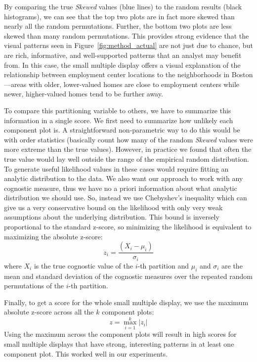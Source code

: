 By comparing the true \emph{Skewed} values (blue lines) to the random results (black histograms), we can see that the top two plots are in fact more skewed than nearly all the random permutations. Further, the bottom two plots are less skewed than many random permutations. This provides strong evidence that the visual patterns seen in Figure~\ref{fig:method_actual} are not just due to chance, but are rich, informative, and well-supported patterns that an analyst may benefit from.  In this case, the small multiple display offers a visual explanation of the relationship between employment center locations to the neighborhoods in Boston---areas with older, lower-valued homes are close to employment centers while newer, higher-valued homes tend to be further away.

To compare this partitioning variable to others, we have to summarize this information in a single score. We first need to summarize how unlikely each component plot is. A straightforward non-parametric way to do this would be with order statistics (basically count how many of the random \emph{Skewed} values were more extreme than the true values). However, in practice we found that often the true value would lay well outside the range of the empirical random distribution. To generate useful likelihood values in these cases would require fitting an analytic distribution to the data. We also want our approach to work with any cognostic measure, thus we have no a priori information about what analytic distribution we should use. So, instead we use Chebyshev's inequality which can give us a very conservative bound on the likelihood with only very weak assumptions about the underlying distribution. This bound is inversely proportional to the standard z-score, so minimizing the likelihood is equivalent to maximizing the absolute z-score:
$$z_i = \frac{(X_i-\mu_i)}{\sigma_i}$$ 
where $X_i$ is the true cognostic value of the $i$-th partition and $\mu_i$ and $\sigma_i$ are the mean and standard deviation of the cognostic measures over the repeated random permutations of the $i$-th partition.

Finally, to get a score for the whole small multiple display, we use the maximum absolute z-score across all the $k$ component plots: 
$$z = \max_{i=1}^k |z_i|$$
Using the maximum across the component plots will result in high scores for small multiple displays that have strong, interesting patterns in at least one component plot. This worked well in our experiments.

